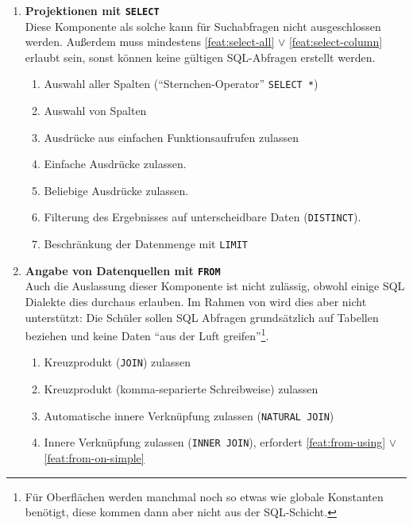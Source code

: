 \begin{enumerate}
\item \textbf{Projektionen mit \texttt{SELECT}} \\
  Diese Komponente als solche kann für Suchabfragen nicht ausgeschlossen werden. Außerdem muss mindestens \ref{feat:select-all} $\lor$ \ref{feat:select-column} erlaubt sein, sonst können keine gültigen SQL-Abfragen erstellt werden.
  \begin{enumerate}
  \item \label{feat:select-all} Auswahl aller Spalten (``Sternchen-Operator'' \texttt{SELECT *})
  \item \label{feat:select-column} Auswahl von Spalten
  \item \label{feat:select-single-function} Ausdrücke aus einfachen Funktionsaufrufen zulassen
  \item \label{feat:select-simple-expression} Einfache Ausdrücke zulassen.
  \item \label{feat:select-expression} Beliebige Ausdrücke zulassen.
  \item \label{feat:select-distinct} Filterung des Ergebnisses auf unterscheidbare Daten (\texttt{DISTINCT}).
  \item \label{feat:select-limit} Beschränkung der Datenmenge mit \texttt{LIMIT}
  \end{enumerate}
\item \textbf{Angabe von Datenquellen mit \texttt{FROM}} \\
  Auch die Auslassung dieser Komponente ist nicht zulässig, obwohl einige SQL Dialekte dies durchaus erlauben. Im Rahmen von \idename wird dies aber nicht unterstützt: Die Schüler sollen SQL Abfragen grundsätzlich auf Tabellen beziehen und keine Daten ``aus der Luft greifen''\footnote{Für Oberflächen werden manchmal noch so etwas wie globale Konstanten benötigt, diese kommen dann aber nicht aus der SQL-Schicht.}.
  \begin{enumerate}
  \item \label{feat:from-cross-join} Kreuzprodukt (\texttt{JOIN}) zulassen
  \item \label{feat:from-cross-comma} Kreuzprodukt (komma-separierte Schreibweise) zulassen
  \item \label{feat:from-natural-join} Automatische innere Verknüpfung zulassen (\texttt{NATURAL JOIN})
  \item \label{feat:from-inner-join} Innere Verknüpfung zulassen (\texttt{INNER JOIN}), erfordert \ref{feat:from-using} $\lor$ \ref{feat:from-on-simple}

\end{enumerate}
\end{enumerate}
